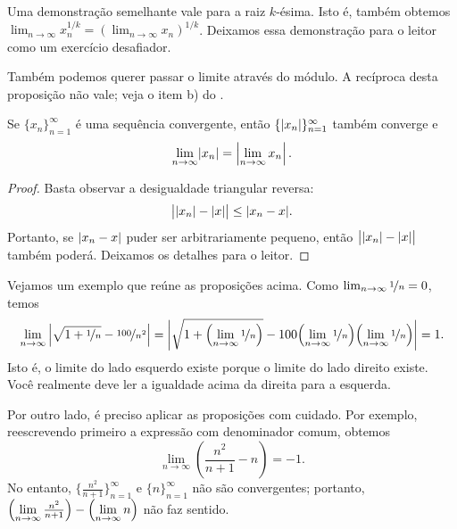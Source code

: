 Uma demonstração semelhante vale para a raiz $k$-ésima. Isto é, também
obtemos
$\lim_{n\to\infty} x_n^{1/k} = {( \lim_{n\to\infty} x_n )}^{1/k}$. Deixamos essa demonstração para o leitor
como um exercício desafiador.

Também podemos querer passar o limite através do módulo.
A recíproca desta proposição não vale; veja o
item b) do .

\begin{prop}
Se $\{ x_n \}_{n=1}^\infty$ é uma sequência convergente, então $\{ \lvert {x_n} \rvert \}_{n=1}^\infty$
também converge e
\begin{equation*}
\lim_{n\to\infty} \lvert {x_n} \rvert =
\left\lvert {\lim_{n\to\infty} x_n} \right\rvert .
\end{equation*}
\end{prop}

\begin{proof}
Basta observar a desigualdade triangular reversa:
\begin{equation*}
\big\lvert \lvert {x_n} \rvert - \lvert {x} \rvert \big\rvert \leq \lvert {x_n-x} \rvert .
\end{equation*}
Portanto, se $\lvert {x_n -x} \rvert$ puder ser arbitrariamente pequeno, então
$\big\lvert \lvert {x_n} \rvert - \lvert {x} \rvert \big\rvert$ também poderá.
Deixamos os detalhes para o leitor.
\end{proof}

Vejamos um exemplo que reúne as proposições acima. Como
$\lim_{n\to\infty} \nicefrac{1}{n} = 0$, temos
\begin{equation*}
\lim_{n\to \infty}
\left\lvert {\sqrt{1 + \nicefrac{1}{n}} - \nicefrac{100}{n^2}} \right\rvert =
\left\lvert {\sqrt{1 + \Bigl(\lim_{n\to\infty} \nicefrac{1}{n}\Bigr)}
- 100 \Bigl(\lim_{n\to\infty} \nicefrac{1}{n}\Bigr)\Bigl(\lim_{n\to\infty} \nicefrac{1}{n}\Bigr)} \right\rvert = 1.
\end{equation*}
Isto é, o limite do lado esquerdo existe porque o limite do lado direito existe. Você realmente deve ler a igualdade acima da direita para a esquerda.

Por outro lado, é preciso aplicar as proposições com cuidado.
Por exemplo, reescrevendo primeiro a expressão com denominador comum,
obtemos
\begin{equation*}
\lim_{n\to \infty} \left( \frac{n^2}{n+1} - n \right)
= -1 .
\end{equation*}
No entanto,
$\bigl\{ \frac{n^2}{n+1} \bigr\}_{n=1}^\infty$ e
$\{n\}_{n=1}^\infty$ não são convergentes;
portanto,
$\Bigl(\lim\limits_{n\to\infty} \frac{n^2}{n+1}\Bigr) -
\Bigl(\lim\limits_{n\to\infty} n\Bigr)$ não faz sentido.


